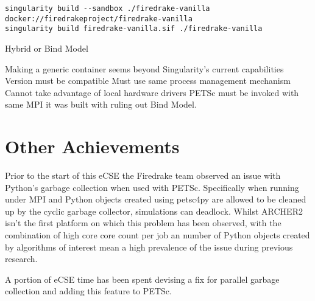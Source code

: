 \documentclass[a4paper,11pt]{article}
\begin{document}
\begin{lstlisting}
singularity build --sandbox ./firedrake-vanilla docker://firedrakeproject/firedrake-vanilla
singularity build firedrake-vanilla.sif ./firedrake-vanilla
\end{lstlisting}

Hybrid or Bind Model

Making a generic container seems beyond Singularity's current capabilities
Version must be compatible
Must use same process management mechanism
Cannot take advantage of local hardware drivers
PETSc must be invoked with same MPI it was built with ruling out Bind Model.


\clearpage
\section{Other Achievements}
\label{sec:other}
Prior to the start of this eCSE the Firedrake team observed an issue with Python's garbage collection when used with PETSc.
Specifically when running under MPI and Python objects created using petsc4py are allowed to be cleaned up by the cyclic garbage collector, simulations can deadlock.
Whilst ARCHER2 isn't the first platform on which this problem has been observed, with the combination of high core core count per job an number of Python objects created by algorithms of interest mean a high prevalence of the issue during previous research.

A portion of eCSE time has been spent devising a fix for parallel garbage collection and adding this feature to PETSc.
\end{document}
